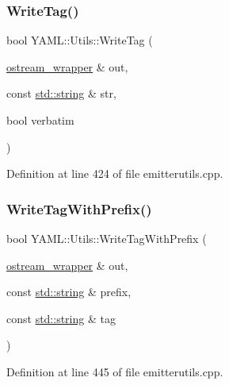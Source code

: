 \subsubsection{\texorpdfstring{WriteTag()}{WriteTag()}}
{\footnotesize\ttfamily bool Y\+A\+M\+L\+::\+Utils\+::\+Write\+Tag (\begin{DoxyParamCaption}\item[{\mbox{\hyperlink{class_y_a_m_l_1_1ostream__wrapper}{ostream\+\_\+wrapper}} \&}]{out,  }\item[{const \mbox{\hyperlink{glad_8h_ac83513893df92266f79a515488701770}{std\+::string}} \&}]{str,  }\item[{bool}]{verbatim }\end{DoxyParamCaption})}



Definition at line 424 of file emitterutils.\+cpp.

\mbox{\label{namespace_y_a_m_l_1_1_utils_a18ff3f00faf332edd6ecb7d3aa968b52}} 
\subsubsection{\texorpdfstring{WriteTagWithPrefix()}{WriteTagWithPrefix()}}
{\footnotesize\ttfamily bool Y\+A\+M\+L\+::\+Utils\+::\+Write\+Tag\+With\+Prefix (\begin{DoxyParamCaption}\item[{\mbox{\hyperlink{class_y_a_m_l_1_1ostream__wrapper}{ostream\+\_\+wrapper}} \&}]{out,  }\item[{const \mbox{\hyperlink{glad_8h_ac83513893df92266f79a515488701770}{std\+::string}} \&}]{prefix,  }\item[{const \mbox{\hyperlink{glad_8h_ac83513893df92266f79a515488701770}{std\+::string}} \&}]{tag }\end{DoxyParamCaption})}



Definition at line 445 of file emitterutils.\+cpp.

